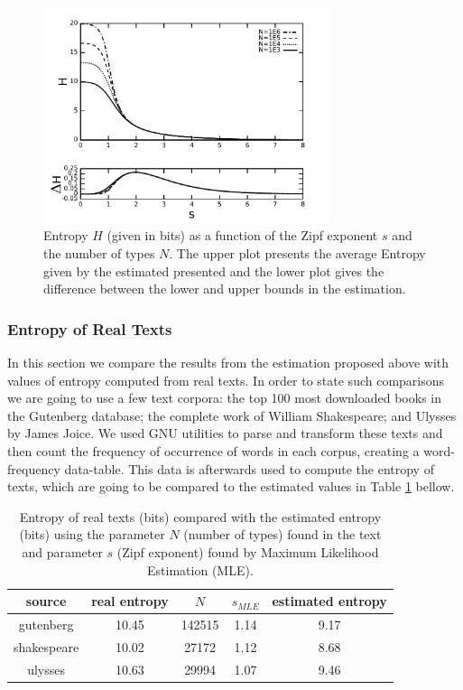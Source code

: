 \begin{figure}[htbp]
\centering
\includegraphics[width=0.75\textwidth]{images/entropy_N_s_limits_fulldh_pb.pdf}
\caption{Entropy $H$ (given in bits) as a function of the Zipf exponent $s$ and the number of types $N$. 
The upper plot presents the average Entropy given by the estimated presented and the lower plot gives
the difference between the lower and upper bounds in the estimation.}
\label{fig:entropy_N_s}
\end{figure}




\subsubsection{Entropy of Real Texts}
In this section we compare the results from the estimation proposed above with values
of entropy computed from real texts. In order to state such comparisons we are going 
to use a few text corpora: the top 100 most downloaded books in the Gutenberg database;
the complete work of William Shakespeare; and Ulysses by James Joice. 
We used GNU utilities to parse and transform these texts and then count the
frequency of occurrence of words in each corpus, creating a word-frequency
data-table. This data is afterwards used to compute the entropy of texts, which
are going to be compared to the estimated values in Table \ref{tab:entropytexts} bellow.

\begin{table}[h!]
\centering
\caption{Entropy of real texts (bits) compared with the estimated entropy (bits) using the parameter $N$ (number of types) found in the text and parameter $s$ (Zipf exponent) found by Maximum Likelihood Estimation (MLE).}
\label{tab:entropytexts}
\begin{tabular}{| c | c | c | c | c |}
  \hline
  source & real entropy & $N$ & $s_{MLE}$ & estimated entropy \\
  \hline
  gutenberg     & 10.45 & 142515 & 1.14 & 9.17 \\
  shakespeare   & 10.02 & 27172  & 1.12 & 8.68 \\
  ulysses       & 10.63 & 29994  & 1.07 & 9.46 \\
  \hline
\end{tabular}
\end{table}

